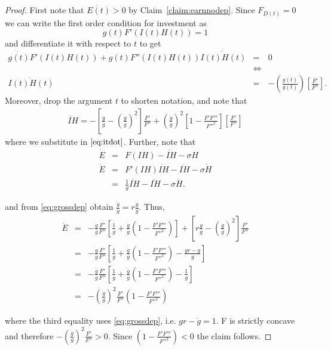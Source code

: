 \begin{proof}
First note that $\dot{E(t)} > 0$ by Claim~\ref{claim:earnnodep}. Since $F_{D(t)} = 0 $ we can write the first order condition for investment as
\begin{equation}
g(t) F'(I(t) H(t)) = 1
\end{equation}
and differentiate it with respect to $t$ to get
\begin{eqnarray}
\dot{g(t)} F'(I(t) H(t)) + g(t) F''(I(t) H(t)) \dot{I(t) H(t)} &=& 0 \nonumber \\
&\Leftrightarrow& \nonumber \\
\dot{I(t) H(t)} &=& - \left( \frac{\dot{g(t)}}{g(t)} \right) \left[ \frac{F'}{F''}\right] \label{eq:itdot}.
\end{eqnarray}
\noindent Moreover, drop the argument $t$ to shorten notation, and note that
\begin{eqnarray}
\ddot{IH} = - \left[ \frac{\ddot{g}}{g} - \left( \frac{\dot{g}}{g} \right)^2 \right] \frac{F'}{F''} + \left( \frac{\dot{g}}{g} \right)^2 \left[ 1 - \frac{F'F'''}{{F''}^2} \right] \left[ \frac{F'}{F''} \right]  
\end{eqnarray}  
where we substitute in $\eqref{eq:itdot}$. Further, note that
\begin{eqnarray}
\dot{E} &=& F(IH) - \dot{IH} - \sigma H \nonumber \\
\ddot{E} &=& F'(IH) \dot{IH} - \ddot{IH} - \sigma \dot{H} \nonumber \\
&=& \frac{1}{g} \dot{IH} - \ddot{IH} - \sigma \dot{H}.
\end{eqnarray}

\noindent and from \eqref{eq:grossdep} obtain $\frac{\ddot{g}}{g} = r \frac{\dot{g}}{g}$. Thus,
\begin{eqnarray}
\ddot{E} &=& - \frac{\dot{g}}{g} \frac{F'}{F''} \left[ \frac{1}{g} + \frac{\dot{g}}{g} \left( 1 - \frac{F'F'''}{{F''}^2} \right) \right] + \left[ r \frac{\dot{g}}{g} - \left( \frac{\dot{g}}{g} \right)^2 \right] \frac{F'}{F''} \nonumber \\
&=& - \frac{\dot{g}}{g} \frac{F'}{F''} \left[ \frac{1}{g} + \frac{\dot{g}}{g} \left( 1 - \frac{F'F'''}{{F''}^2} \right) - \frac{gr - \dot{g}}{g} \right] \nonumber \\
&=& - \frac{\dot{g}}{g} \frac{F'}{F''} \left[ \frac{1}{g} + \frac{\dot{g}}{g} \left( 1 - \frac{F'F'''}{{F''}^2} \right) - \frac{1}{g} \right] \nonumber \\
&=& - \left( \frac{\dot{g}}{g} \right)^2 \frac{F'}{F''} \left( 1 - \frac{F'F'''}{{F''}^2} \right)
\end{eqnarray}

\noindent where the third equality uses \eqref{eq:grossdep}, i.e. $gr - \dot{g} = 1$. F is strictly concave and therefore $-\left( \frac{\dot{g}}{g} \right)^2 \frac{F'}{F''} > 0$. Since $\left( 1 - \frac{F'F'''}{{F''}^2} \right) < 0$ the claim follows.
\end{proof}

